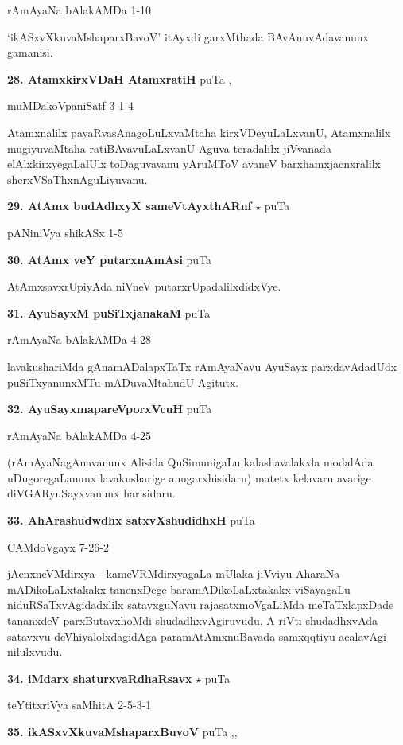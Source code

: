 \hfill rAmAyaNa bAlakAMDa 1-10

`ikASxvXkuvaMshaparxBavoV' itAyxdi garxMthada BAvAnuvAdavanunx gamanisi.

\medskip
\noindent\textbf{28. AtamxkirxVDaH AtamxratiH} \hfill puTa \pageref{118},\pageref{143}

\hfill muMDakoVpaniSatf 3-1-4

Atamxnalilx payaRvasAnagoLuLxvaMtaha kirxVDeyuLaLxvanU, Atamxnalilx mugiyuvaMtaha ratiBAvavuLaLxvanU Aguva teradalilx jiVvanada elAlxkirxyegaLalUlx toDaguvavanu yAruMToV avaneV barxhamxjacnxralilx sherxVSaThxnAguLiyuvanu.

\medskip
\noindent\textbf{29. AtAmx budAdhxyX sameVtAyxthARnf} $\star$ \hfill puTa \pageref{18}

\hfill pANiniVya shikASx 1-5

\medskip
\noindent\textbf{30. AtAmx veY putarxnAmAsi} \hfill puTa \pageref{228}

AtAmxsavxrUpiyAda niVneV putarxrUpadalilxdidxVye.

\medskip
\noindent\textbf{31. AyuSayxM puSiTxjanakaM} \hfill puTa \pageref{210}

\hfill rAmAyaNa bAlakAMDa 4-28

lavakushariMda gAnamADalapxTaTx rAmAyaNavu AyuSayx parxdavAdadUdx puSiTxyanunxMTu mADuvaMtahudU Agitutx.

\medskip
\noindent\textbf{32. AyuSayxmapareVporxVcuH} \hfill puTa \pageref{168g}

\hfill rAmAyaNa bAlakAMDa 4-25

(rAmAyaNagAnavanunx Alisida QuSimunigaLu kalashavalakxla modalAda uDugoregaLanunx lavakusharige anugarxhisidaru) matetx kelavaru avarige diVGARyuSayxvanunx harisidaru.

\medskip
\noindent\textbf{33. AhArashudwdhx satxvXshudidhxH} \hfill puTa \pageref{76b}

\hfill CAMdoVgayx 7-26-2

jAcnxneVMdirxya - kameVRMdirxyagaLa mUlaka jiVviyu AharaNa mADikoLaLxtakakx-tanenxDege baramADikoLaLxtakakx viSayagaLu niduRSaTxvAgidadxlilx satavxguNavu rajasatxmoVgaLiMda meTaTxlapxDade tananxdeV parxButavxhoMdi shudadhxvAgiruvudu. A riVti shudadhxvAda satavxvu deVhiyalolxdagidAga paramAtAmxnuBavada samxqqtiyu acalavAgi nilulxvudu.

\medskip
\noindent\textbf{34. iMdarx  shaturxvaRdhaRsavx} $\star$ \hfill puTa \pageref{9}

\hfill teYtitxriVya saMhitA 2-5-3-1

\medskip
\noindent\textbf{35. ikASxvXkuvaMshaparxBuvoV} \hfill puTa \pageref{154},\pageref{163aa},\pageref{196}

